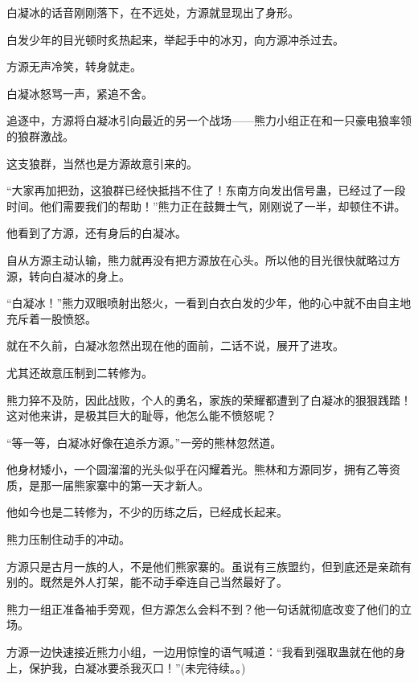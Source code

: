 \begin{this_body}
白凝冰的话音刚刚落下，在不远处，方源就显现出了身形。

白发少年的目光顿时炙热起来，举起手中的冰刃，向方源冲杀过去。

方源无声冷笑，转身就走。

白凝冰怒骂一声，紧追不舍。

追逐中，方源将白凝冰引向最近的另一个战场——熊力小组正在和一只豪电狼率领的狼群激战。

这支狼群，当然也是方源故意引来的。

“大家再加把劲，这狼群已经快抵挡不住了！东南方向发出信号蛊，已经过了一段时间。他们需要我们的帮助！”熊力正在鼓舞士气，刚刚说了一半，却顿住不讲。

他看到了方源，还有身后的白凝冰。

自从方源主动认输，熊力就再没有把方源放在心头。所以他的目光很快就略过方源，转向白凝冰的身上。

“白凝冰！”熊力双眼喷射出怒火，一看到白衣白发的少年，他的心中就不由自主地充斥着一股愤怒。

就在不久前，白凝冰忽然出现在他的面前，二话不说，展开了进攻。

尤其还故意压制到二转修为。

熊力猝不及防，因此战败，个人的勇名，家族的荣耀都遭到了白凝冰的狠狠践踏！这对他来讲，是极其巨大的耻辱，他怎么能不愤怒呢？

“等一等，白凝冰好像在追杀方源。”一旁的熊林忽然道。

他身材矮小，一个圆溜溜的光头似乎在闪耀着光。熊林和方源同岁，拥有乙等资质，是那一届熊家寨中的第一天才新人。

他如今也是二转修为，不少的历练之后，已经成长起来。

熊力压制住动手的冲动。

方源只是古月一族的人，不是他们熊家寨的。虽说有三族盟约，但到底还是亲疏有别的。既然是外人打架，能不动手牵连自己当然最好了。

熊力一组正准备袖手旁观，但方源怎么会料不到？他一句话就彻底改变了他们的立场。

方源一边快速接近熊力小组，一边用惊惶的语气喊道：“我看到强取蛊就在他的身上，保护我，白凝冰要杀我灭口！”(未完待续。。)

\end{this_body}

